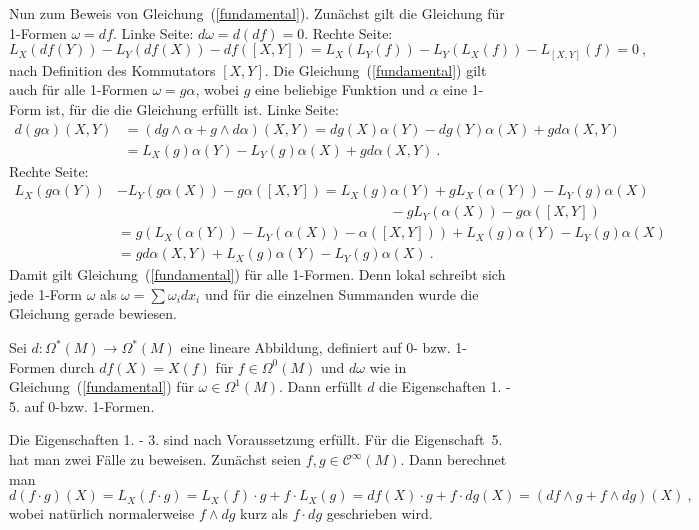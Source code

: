 \documentclass[%
	paper=a5,%
	fleqn,%
	DIV=18,%
	BCOR=0mm,
	fontsize=11pt,
	titlepage=false,%
	bibliography=totoc,
	DIV=18,%
	twoside=true,
	pdftitle=Riemannsche Geometrie,
	pdfauthor=Uwe Semmelmann,
	numbers=noendperiod]%
	{scrbook}
\begin{document}
Nun zum Beweis von Gleichung~(\ref{fundamental}). Zun\"achst gilt die Gleichung f\"ur 1-Formen
$\omega = df$. Linke Seite: $ d\omega = d(df)=0$. Rechte Seite:
$$
 L_X(df (Y)) - L_Y(df(X)) - df([X, Y]) = L_X(L_Y(f)) - L_Y(L_X(f)) - L_{[X, Y]}(f) = 0 \ ,
$$
nach Definition des Kommutators $[X,Y]$. Die Gleichung~(\ref{fundamental}) gilt auch f\"ur alle
1-Formen $\omega = g \alpha$, wobei $g$ eine beliebige Funktion und $\alpha$ eine 1-Form ist, f\"ur
die die Gleichung erf\"ullt ist. Linke Seite:
$$
\begin{array}{rl}
d(g\alpha)(X,Y)
& = (dg \wedge \alpha + g \wedge d\alpha)(X,Y)
= dg(X)\alpha(Y) - dg(Y)\alpha(X) + gd\alpha(X,Y)\\[1.5ex]
& = L_X(g)\alpha(Y) - L_Y(g)\alpha(X) + gd\alpha(X,Y) \ .
\end{array}
$$
Rechte Seite:
$$
\begin{array}{rl}
L_X(g\alpha(Y)) & - L_Y(g\alpha(X)) - g\alpha([X,Y])
 =
L_X(g) \alpha(Y) + gL_X(\alpha(Y)) - L_Y(g)\alpha(X) \\[1ex]
& \phantom{xxxxxxxxxxxxxxxxxxxxxxxxxxxxxxxxxx} - g L_Y(\alpha(X)) -g \alpha([X,Y]) \\[1.5ex]
& =
g( L_X(\alpha(Y)) - L_Y(\alpha(X)) - \alpha([X,Y])) + L_X(g) \alpha(Y) - L_Y(g)\alpha(X)\\[1.5ex]
& =
g d\alpha(X,Y) + L_X(g) \alpha(Y) - L_Y(g)\alpha(X) \ .
\end{array}
$$
Damit gilt Gleichung~(\ref{fundamental}) f\"ur alle 1-Formen. Denn lokal schreibt sich jede
1-Form $\omega$ als $\omega = \sum \omega_i dx_i$ und f\"ur die einzelnen Summanden wurde
die Gleichung gerade bewiesen.

\medskip

Sei $d: \Omega^*(M) \rightarrow \Omega^*(M)$ eine lineare Abbildung, definiert auf 0- bzw. 1-Formen
durch  $df(X)=X(f)$ f\"ur $f\in \Omega^0(M)$ und $d\omega$ wie in Gleichung~(\ref{fundamental}) f\"ur
$\omega \in \Omega^1(M)$. Dann erf\"ullt $d$ die Eigenschaften 1. - 5. auf 0-bzw. 1-Formen.

Die Eigenschaften 1. - 3. sind nach Voraussetzung erf\"ullt. F\"ur die Eigenschaft~5. hat man zwei
F\"alle zu beweisen. Zun\"achst seien $f, g \in \mathcal C^\infty(M)$. Dann berechnet man
$$
d(f\cdot g)(X) = L_X(f\cdot g) = L_X(f)\cdot g + f\cdot L_X(g)
=
df(X)\cdot g + f \cdot dg(X)
=
(df \wedge g + f \wedge dg)(X) \ ,
$$
wobei nat\"urlich normalerweise $f \wedge dg$ kurz als  $ f \cdot dg$ geschrieben wird.

\medskip
\end{document}
